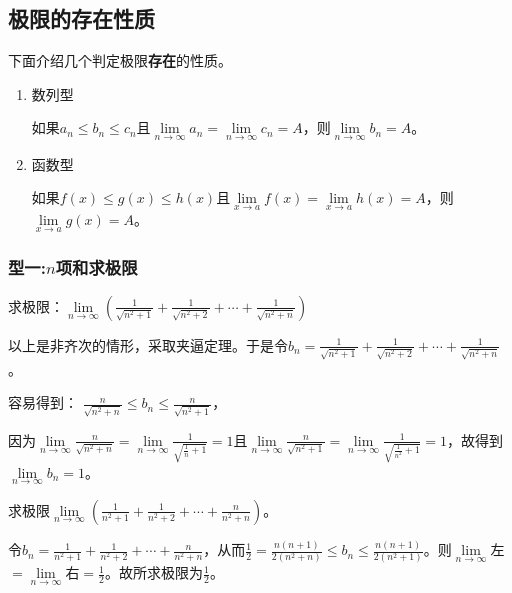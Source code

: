     \subsection{极限的存在性质}
    下面介绍几个判定极限\textbf{存在}的性质。
    \begin{property}
    \begin{enumerate}
        \item 数列型
       
        如果$ a_n\leq b_n\leq c_n $且$ \lim\limits_{n \to \infty}a_n=\lim\limits_{n \to \infty}c_n=A $，则$ \lim\limits_{n \to \infty}b_n=A $。
        \item 函数型
        
        如果$ f(x)\leq g(x)\leq h(x) $且$ \lim\limits_{x \to a}f(x)=\lim\limits_{x \to a}h(x)=A $，则$ \lim\limits_{x \to a}g(x)=A $。
    \end{enumerate}
    \end{property}
    \subsubsection*{型一:$n$项和求极限}
    \begin{example}
        求极限：$\lim\limits_{n \to \infty}(\displaystyle\frac{1}{\sqrt{n^2+1}}+\displaystyle\frac{1}{\sqrt{n^2+2}}+ \cdots +\frac{1}{\sqrt{n^2+n}})$
    \end{example}
    \begin{solution}
        以上是非齐次的情形，采取夹逼定理。于是令$b_n=\displaystyle\frac{1}{\sqrt{n^2+1}}+\displaystyle\frac{1}{\sqrt{n^2+2}}+ \cdots +\frac{1}{\sqrt{n^2+n}}$。
        
        容易得到：
        $\displaystyle\frac{n}{\sqrt{n^2+n}}\leq b_n \leq \displaystyle\frac{n}{\sqrt{n^2+1}}$，
        
        因为$\lim\limits_{n \to \infty}\displaystyle\frac{n}{\sqrt{n^2+n}}=\lim\limits_{n\to\infty}\displaystyle\frac{1}{\sqrt{\frac{1}{n}+1}}=1$且$\lim\limits_{n \to \infty}\displaystyle\frac{n}{\sqrt{n^2+1}}=\lim\limits_{n\to\infty}\displaystyle\frac{1}{\sqrt{\frac{1}{n^2}+1}}=1$，故得到$\lim\limits_{n \to \infty}b_n=1$。
    \end{solution}

    \begin{example}
        求极限$ \lim\limits_{n \to \infty}(\displaystyle\frac{1}{n^2+1}+\displaystyle\frac{1}{n^2+2}+\cdots+\displaystyle\frac{n}{n^2+n}) $。
    \end{example}
    \begin{solution}
        令$ b_n=\displaystyle\frac{1}{n^2+1}+\displaystyle\frac{1}{n^2+2}+\cdots+\displaystyle\frac{n}{n^2+n}$，从而$\displaystyle\frac{1}{2}=\displaystyle\frac{n(n+1)}{2(n^2+n)} \leq b_n \leq\displaystyle\frac{n(n+1)}{2(n^2+1)}$。则$\lim\limits_{n \to \infty}$左$=\lim\limits_{n \to \infty}$右$=\displaystyle\frac{1}{2}$。故所求极限为$\displaystyle\frac{1}{2}$。
    \end{solution}

